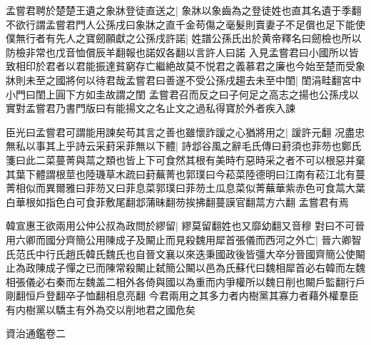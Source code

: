 孟嘗君聘於楚楚王遺之象牀登徒直送之|{
	象牀以象齒為之登徒姓也直其名遺于季翻}
不欲行謂孟嘗君門人公孫戌曰象牀之直千金苟傷之毫髮則賣妻子不足償也足下能使僕無行者有先人之寶劒願獻之公孫戌許諾|{
	姓譜公孫氏出於黄帝釋名曰劒檢也所以防檢非常也戊音恤償辰羊翻報也諾奴各翻以言許人曰諾}
入見孟嘗君曰小國所以皆致相印於君者以君能振達貧窮存亡繼絶故莫不悦君之義慕君之廉也今始至楚而受象牀則未至之國將何以待君哉孟嘗君曰善遂不受公孫戌趨去未至中閨|{
	閨涓畦翻宮中小門曰閨上圓下方如圭故謂之閨}
孟嘗君召而反之曰子何足之高志之揚也公孫戌以實對孟嘗君乃書門版曰有能揚文之名止文之過私得寶於外者疾入諫

臣光曰孟嘗君可謂能用諫矣苟其言之善也雖懷詐諼之心猶將用之|{
	諼許元翻}
况盡忠無私以事其上乎詩云采葑采菲無以下體|{
	詩邶谷風之辭毛氏傳曰葑須也菲芴也鄭氏箋曰此二菜蔓菁與蒚之類也皆上下可食然其根有美時冇惡時采之者不可以根惡并棄其葉下體謂根莖也陸璣草木疏曰葑蕪菁也郭璞曰今菘菜陸德明曰江南有菘江北有蔓菁相似而異爾雅曰菲芴又曰菲息菜郭璞曰菲芴土瓜息菜似菁蕪華紫赤色可食蒚大葉白華根如指色白可食菲敷尾翻邶蒲昧翻芴挨拂翻蔓謨官翻蒚方六翻}
孟嘗君有焉

韓宣惠王欲兩用公仲公叔為政問於繆留|{
	繆莫留翻姓也又靡幼翻又音穆}
對曰不可晉用六卿而國分齊簡公用陳成子及闞止而見殺魏用犀首張儀而西河之外亡|{
	晉六卿智氏范氏中行氏趙氏韓氏魏氏也自晉文襄以來迭秉國政後皆彊大卒分晉國齊簡公使闞止為政陳成子憚之已而陳常殺闞止弑簡公闞以邑為氏蘇代曰魏相犀首必右韓而左魏相張儀必右秦而左魏盖二相外各倚與國以為重而内爭權所以魏日削也闞戶監翻行戶剛翻恒戶登翻卒子恤翻相息亮翻}
今君兩用之其多力者内樹黨其寡力者藉外權羣臣有内樹黨以驕主有外為交以削地君之國危矣

資治通鑑卷二
